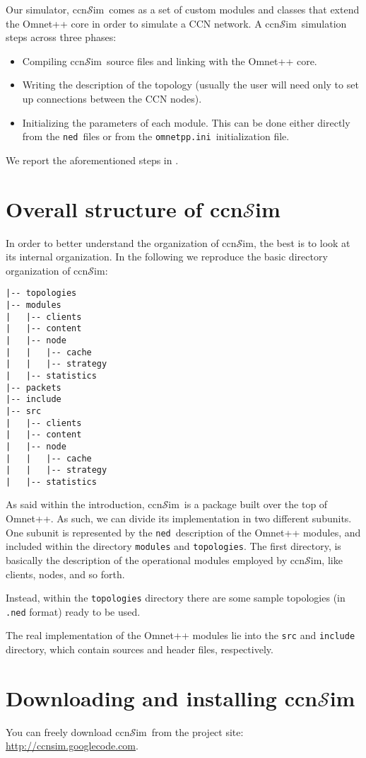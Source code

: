 \documentclass{book}
\newcommand{\ccnsim}{ccn$\mathcal{S}$im}
\newcommand{\ned}{\texttt{ned}}
\newcommand{\ini}{\texttt{omnetpp.ini}}
\begin{document}
Our simulator, \ccnsim\ comes as a set of custom modules and classes that extend the Omnet++ core in order to simulate a CCN network. A \ccnsim\ simulation steps across three phases:  
\begin{itemize}
    \item Compiling  \ccnsim\ source files and linking with the Omnet++ core.
    \item Writing  the description of the topology (usually the user will need only to set up connections between the CCN nodes).
    \item Initializing the  parameters of each module. This can be done either directly from the \ned\ files or from the \ini\ initialization file. 
\end{itemize}
We report the aforementioned steps in .
\section{Overall structure of \ccnsim}
In order to better understand the organization of \ccnsim, the best is to look at its internal organization. In the following we reproduce the basic directory organization of \ccnsim:
\begin{Verbatim}[frame=single]
|-- topologies
|-- modules
|   |-- clients
|   |-- content
|   |-- node
|   |   |-- cache
|   |   |-- strategy
|   |-- statistics
|-- packets
|-- include
|-- src
|   |-- clients
|   |-- content
|   |-- node
|   |   |-- cache
|   |   |-- strategy
|   |-- statistics
\end{Verbatim}
As said within the introduction, \ccnsim\ is a package built over the top of Omnet++. As such, we can divide its implementation in two different subunits. One subunit is represented by the \ned\ description of the Omnet++ modules, and included within the directory \verb|modules| and \verb|topologies|. The first directory, is basically the description of the operational modules employed by \ccnsim, like clients, nodes, and so forth. 

Instead, within the \verb|topologies| directory there are some sample topologies (in \verb|.ned| format) ready to be used. 

The real implementation of the Omnet++ modules lie into the \verb|src| and \verb|include| directory, which contain sources and header files, respectively.  
\section{Downloading and installing \ccnsim}
You can freely download \ccnsim\ from the project site: \url{http://ccnsim.googlecode.com}. 
\end{document}
